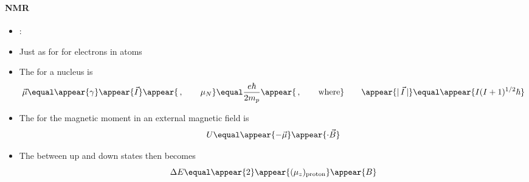 \begin{frame}
\frametitle{\texorpdfstring{\culine[\sectiontitleulinecolor]{\sectiontitle}}{\sectiontitle} }
\framesubtitle{NMR}

\begin{itemize}
	\item[] :
	
	\item Just as for  for electrons in atoms

\item The  for a nucleus is 
\[
\vec{\mu}  \equal \appear{\gamma} \appear{\vec{I}} \appear{\,, \qquad \mu_{N}}  \equal \frac{e \hbar}{2 m_{p}} \appear{\,, \qquad \text{where}} \qquad \appear{|\, \vec{I} \,|}  \equal  \appear{I(I+1)^{1 / 2} \hbar}
\]

\item The  for the magnetic moment in an external magnetic field is 
\[
U  \equal \appear{-\vec{\mu}} \appear{\cdot \vec{B}}
\]

\item The  between up and down states then becomes
\[
\Delta E  \equal \appear{2} \appear{( \mu_{z} )_{\text {proton}}} \appear{B}
\]
\end{itemize}


\endofslide 
\end{frame}

